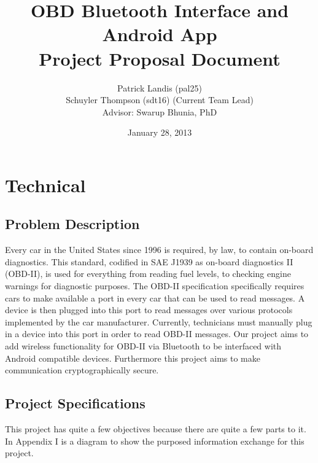 \documentclass[12pt,letterpaper]{article}
\title{
\textbf{\LARGE OBD Bluetooth Interface and Android App} \\
\Large Project Proposal Document
}
\author{
\normalsize Patrick Landis (pal25) \\
\normalsize Schuyler Thompson (sdt16) (Current Team Lead) \\
\normalsize Advisor: Swarup Bhunia, PhD
}
\date{\normalsize January 28, 2013}
\begin{document}
\maketitle

\newpage

\section{Technical}
\subsection{Problem Description}
Every car in the United States since 1996 is required, by law, to contain on-board diagnostics. This standard, codified in SAE J1939 as on-board diagnostics II (OBD-II), is used for everything from reading fuel levels, to checking engine warnings for diagnostic purposes. The OBD-II specification specifically requires cars to make available a port in every car that can be used to read messages. A device is then plugged into this port to read messages over various protocols implemented by the car manufacturer. Currently, technicians must manually plug in a device into this port in order to read OBD-II messages. Our project aims to add wireless functionality for OBD-II via Bluetooth to be interfaced with Android compatible devices. Furthermore this project aims to make communication cryptographically secure.


\subsection{Project Specifications}
This project has quite a few objectives because there are quite a few parts to it. In Appendix I is a diagram to show the purposed information exchange for this project.
\end{document}
